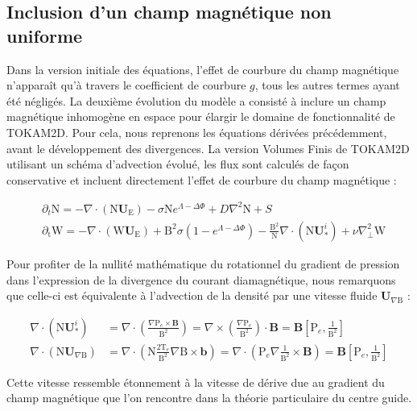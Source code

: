 \begin{refsection}
	\subsection{Inclusion d'un champ magnétique non uniforme}
	
	Dans la version initiale
	des équations, l'effet de courbure du champ magnétique n'apparaît qu'à travers
	le coefficient de courbure $g$, tous les autres termes ayant été négligés.
	La deuxième évolution du modèle a consisté à inclure un champ magnétique
	inhomogène en espace pour élargir le domaine de fonctionnalité de TOKAM2D. Pour
	cela, nous reprenons les équations dérivées précédemment, avant le développement
	des divergences. La version Volumes Finis de TOKAM2D utilisant un schéma
	d'advection évolué, les flux sont calculés de façon conservative et incluent
	directement l'effet de courbure du champ magnétique :
	
\begin{align}
\label{2-eqContinuiteMag}
&\partial_t \text{N}
= - \nabla\cdot\left(\text{N}\mathbf U_\text{E}\right) -\sigma
\text{N}e^{\Lambda-\Delta\Phi} + D\nabla^2 \text{N} + S
\\
\label{2-eqCourantMag}
&\partial_\text{t}\text{W} = 
-\nabla\cdot\left(\text{W}\mathbf U_\text{E}\right)
+\text{B}^2\sigma\left(1-e^{\Lambda-\Delta\Phi}\right) 
-\frac{\text{B}^2}{\text{N}}\nabla\cdot\left(\text{N}\mathbf U^i_*\right) 
+\nu\nabla_\perp^2\text{W}
\end{align}

Pour profiter de la nullité mathématique du rotationnel du gradient de
pression dans l'expression de la divergence du courant
diamagnétique, nous remarquons que celle-ci est équivalente à l'advection de la
densité par une vitesse fluide $\mathbf U_{\nabla\text{B}}$ :

\begin{align}
\nabla\cdot\left(\text{N}\mathbf U^i_{*}\right)&=
\nabla\cdot\left(\frac{\nabla\text{P}_e\times\mathbf
B}{\text{B}^2}\right)=
\nabla\times\left(\frac{\nabla\text{P}_e}{\text{B}^2}\right)\cdot
\mathbf B=\mathbf B\left[\text{P}_e,\frac{1}{\text{B}^2}\right]\\
\nabla\cdot\left(\text{N}\mathbf U_{\nabla\text{B}}\right)&=
\nabla\cdot\left(\text{N}\frac{2\text{T}_e}{\text{B}^2}\nabla\text{B}\times\mathbf
b\right)=
\nabla\cdot\left(\text{P}_e\nabla\frac{1}{\text{B}^2}\times\mathbf
B\right)=\mathbf B\left[\text{P}_e,\frac{1}{\text{B}^2}\right]
\end{align}

Cette vitesse ressemble étonnement à la vitesse de dérive due au gradient du
champ magnétique que l'on rencontre dans la théorie particulaire du centre
guide. 


\end{refsection}
